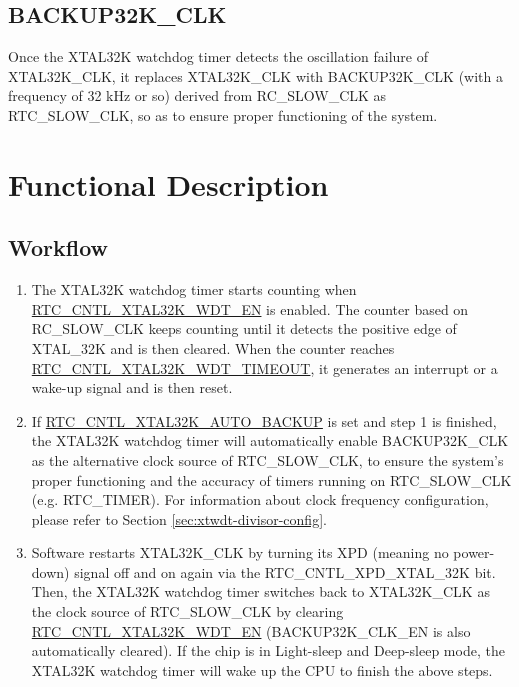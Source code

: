 \documentclass[main\_\_EN.tex]{subfiles}
\begin{document}
\subsection{BACKUP32K\_CLK}

Once the XTAL32K watchdog timer detects the oscillation failure of XTAL32K\_CLK, it replaces XTAL32K\_CLK with BACKUP32K\_CLK (with a frequency of 32 kHz or so) derived from RC\_SLOW\_CLK as RTC\_SLOW\_CLK, so as to ensure proper functioning of the system.

\section{Functional Description}

\subsection{Workflow}

\begin{enumerate}
    \item The XTAL32K watchdog timer starts counting when \hyperref[fielddesc:RTCCNTLXTAL32KWDTEN]{RTC\_CNTL\_XTAL32K\_WDT\_EN} is enabled. The counter based on RC\_SLOW\_CLK keeps counting until it detects the positive edge of XTAL\_32K and is then cleared. When the counter reaches \hyperref[fielddesc:RTCCNTLXTAL32KWDTTIMEOUT]{RTC\_CNTL\_XTAL32K\_WDT\_TIMEOUT}, it generates an interrupt or a wake-up signal and is then reset.
    \item If \hyperref[fielddesc:RTCCNTLXTAL32KAUTOBACKUP]{RTC\_CNTL\_XTAL32K\_AUTO\_BACKUP} is set and step 1 is finished, the XTAL32K watchdog timer will automatically enable BACKUP32K\_CLK as the alternative clock source of RTC\_SLOW\_CLK, to ensure the system's proper functioning and the accuracy of timers running on RTC\_SLOW\_CLK (e.g. RTC\_TIMER). For information about clock frequency configuration, please refer to Section \ref{sec:xtwdt-divisor-config}.
    \item Software restarts XTAL32K\_CLK by turning its XPD (meaning no power-down) signal off and on again via the RTC\_CNTL\_XPD\_XTAL\_32K bit. Then, the XTAL32K watchdog timer switches back to XTAL32K\_CLK as the clock source of RTC\_SLOW\_CLK by clearing \hyperref[fielddesc:RTCCNTLXTAL32KWDTEN]{RTC\_CNTL\_XTAL32K\_WDT\_EN} (BACKUP32K\_CLK\_EN is also automatically cleared). If the chip is in 
   Light-sleep and Deep-sleep mode, the XTAL32K watchdog timer will wake up the CPU to finish the above steps.
\end{enumerate}
\end{document}
